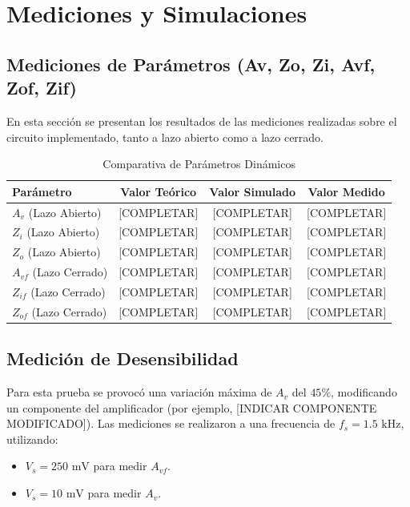 \chapter{Mediciones y Simulaciones}

\section{Mediciones de Parámetros (Av, Zo, Zi, Avf, Zof, Zif)}
En esta sección se presentan los resultados de las mediciones realizadas sobre el circuito implementado, tanto a lazo abierto como a lazo cerrado.

\begin{table}[H]
    \centering
    \begin{tabular}{|l|c|c|c|}
        \hline
        \textbf{Parámetro} & \textbf{Valor Teórico} & \textbf{Valor Simulado} & \textbf{Valor Medido} \\ \hline
        $A_v$ (Lazo Abierto) & [COMPLETAR] & [COMPLETAR] & [COMPLETAR] \\ \hline
        $Z_i$ (Lazo Abierto) & [COMPLETAR] & [COMPLETAR] & [COMPLETAR] \\ \hline
        $Z_o$ (Lazo Abierto) & [COMPLETAR] & [COMPLETAR] & [COMPLETAR] \\ \hline
        $A_{vf}$ (Lazo Cerrado) & [COMPLETAR] & [COMPLETAR] & [COMPLETAR] \\ \hline
        $Z_{if}$ (Lazo Cerrado) & [COMPLETAR] & [COMPLETAR] & [COMPLETAR] \\ \hline
        $Z_{of}$ (Lazo Cerrado) & [COMPLETAR] & [COMPLETAR] & [COMPLETAR] \\ \hline
    \end{tabular}
    \caption{Comparativa de Parámetros Dinámicos}
    \label{tab:parametros}
\end{table}

\section{Medición de Desensibilidad}
Para esta prueba se provocó una variación máxima de $A_v$ del $45\%$, modificando un componente del amplificador (por ejemplo, [INDICAR COMPONENTE MODIFICADO]). Las mediciones se realizaron a una frecuencia de $f_s = 1.5 \text{ kHz}$, utilizando:
\begin{itemize}
    \item $V_s = 250 \text{ mV}$ para medir $A_{vf}$.
    \item $V_s = 10 \text{ mV}$ para medir $A_v$.
\end{itemize}

